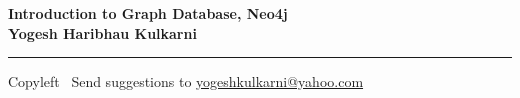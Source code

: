 
\graphicspath{{images/}}

\footnotesize


\begin{center}
\Large{\textbf{Introduction to Graph Database, Neo4j\\ Yogesh Haribhau Kulkarni}}  
\end{center}

\begin{multicols}{2}

\end{multicols}

\rule{\linewidth}{0.25pt}
\scriptsize
Copyleft \textcopyleft\  Send suggestions to 
\href{http://www.yogeshkulkarni.com}{yogeshkulkarni@yahoo.com}


